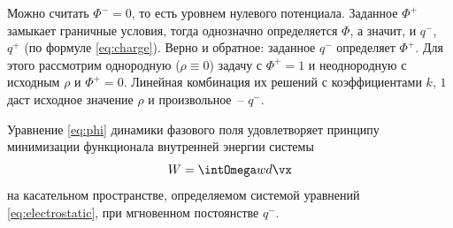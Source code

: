 Можно считать $\Phi^- = 0$, то есть уровнем нулевого потенциала. Заданное $\Phi^+$ замыкает граничные условия, тогда однозначно определяется $\Phi$, а значит, и $q^-$, $q^+$ (по формуле \eqref{eq:charge}). Верно и обратное: заданное $q^-$ определяет $\Phi^+$. Для этого рассмотрим однородную ($\rho \equiv 0$) задачу с $\Phi^+ = 1$ и неоднородную с исходным $\rho$ и $\Phi^+ = 0$. Линейная комбинация их решений с коэффициентами $k$, $1$ даст исходное значение $\rho$ и произвольное~-- $q^-$.

\begin{proposition}
\label{prop:minimization}
Уравнение \eqref{eq:phi} динамики фазового поля удовлетворяет принципу минимизации функционала внутренней энергии системы
\begin{equation}
    W = \intOmega w d \vx
    \label{eq:energy_inner}
\end{equation}
на касательном пространстве, определяемом системой уравнений \eqref{eq:electrostatic}, при мгновенном постоянстве $q^-$.
\end{proposition}

